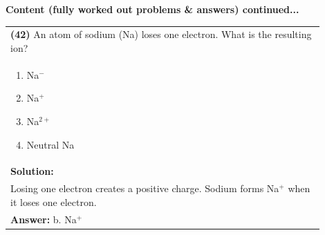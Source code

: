 \documentclass{article}
\begin{document}
\noindent
{\large\textbf{Content (fully worked out problems \& answers) continued...}}\\[0.2em]
\vspace{0.2cm}
\begin{tabular}{|p{0.9\linewidth}|}
\hline
\vspace{0.2cm}
\textbf{(42)} An atom of sodium (Na) loses one electron. What is the resulting ion? \\
\begin{minipage}[t]{0.85\linewidth}
\begin{enumerate}[label=\alph*.]
\item Na$^-$
\item Na$^{+}$
\item Na$^{2+}$
\item Neutral Na
\end{enumerate}
\end{minipage}\\
\hline
\vspace{0.2cm}
\textbf{Solution:} \\
Losing one electron creates a positive charge. Sodium forms Na$^{+}$ when it loses one electron. \\
\hline
\vspace{0.2cm}
\textbf{Answer:} b. Na$^{+}$ \\
\hline
\end{tabular}
\newpage
\end{document}
